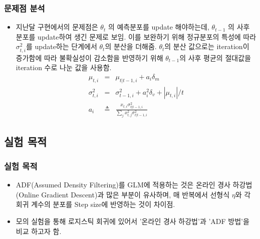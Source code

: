 \documentclass{beamer}
\begin{document}
\begin{frame}
\frametitle{문제점 분석}
\begin{itemize}

\item 지난달 구현에서의 문제점은 $\theta_{t}$ 의 예측분포를 update 해야하는데, $\theta_{t-1}$ 의 사후 분포를 update하여 생긴 문제로 보임. 이를 보완하기 위해 정규분포의 특성에 따라 $\sigma^2_{t,i}$를 update하는 단계에서 $\theta_{t}$의 분산을 더해줌. $\theta_{t}$의 분산 값으로는 iteration이 증가함에 따라 불확실성이 감소함을 반영하기 위해 $\theta_{t-1}$의 사후 평균의 절대값을 iteration 수로 나눈 값을 사용함.
\begin{eqnarray}
 \mu_{t,i} &=& \mu_{t|t-1,i} + a_i \delta_m
\\ \sigma^2_{t,i} &=& \sigma^2_{t-1,i} + a^2_i \delta_v + |\mu_{t,i}|/t
\\ a_i &\triangleq& \frac{x_{t,i}\sigma^2_{t|t-1,i}}{\sum_j x^2_{t,j}\sigma^2_{t|t-1,i}}
\end{eqnarray}

\end{itemize}
\end{frame}






\subsection{실험 목적} %

\begin{frame}
\frametitle{실험 목적}
\begin{itemize}
\item ADF(Assumed Density Filtering)를 GLM에 적용하는 것은 온라인 경사 하강법(Online Gradient Descent)과 많은 부분이 유사하며, 매 반복에서 선형식 $\eta$와 각 회귀 계수의 분포를 Step size에 반영하는 것이 차이점.
\item 모의 실험을 통해 로지스틱 회귀에 있어서 '온라인 경사 하강법'과 'ADF 방법'을 비교 하고자 함. 
\end{itemize}
\end{frame}
\end{document}
